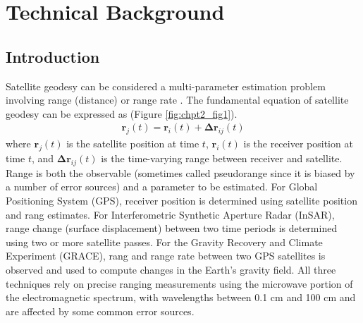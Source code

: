\chapter{Technical Background}
\section{Introduction}
Satellite geodesy can be considered a multi-parameter estimation problem involving range (distance) or range rate \cite[]{seeber2003chpt2}.  The fundamental equation of satellite geodesy can be expressed as (Figure \ref{fig:chpt2_fig1}).  
\begin{equation} \label{eq:chpt2_eq1}
\begin{aligned}
\textbf{r}_{j}(t)=\textbf{r}_{i}(t)+\boldsymbol{\Delta r}_{ij}(t)
\end{aligned}
\end{equation}
where $\textbf{r}_{j}(t)$ is the satellite position at time $t$, $\textbf{r}_{i}(t)$ is the receiver position at time $t$, and $\boldsymbol{\Delta r}_{ij}(t)$ is the time-varying range between receiver and satellite.  Range is both the observable (sometimes called pseudorange since it is biased by a number of error sources) and a parameter to be estimated.  For Global Positioning System (GPS), receiver position is determined using satellite position and rang estimates.  For Interferometric Synthetic Aperture Radar (InSAR), range change (surface displacement) between two time periods is determined using two or more satellite passes.  For the Gravity Recovery and Climate Experiment (GRACE), rang and range rate between two GPS satellites is observed and used to compute changes in the Earth’s gravity field.  All three techniques rely on precise ranging measurements using the microwave portion of the electromagnetic spectrum, with wavelengths between 0.1 cm and 100 cm and are affected by some common error sources. 

